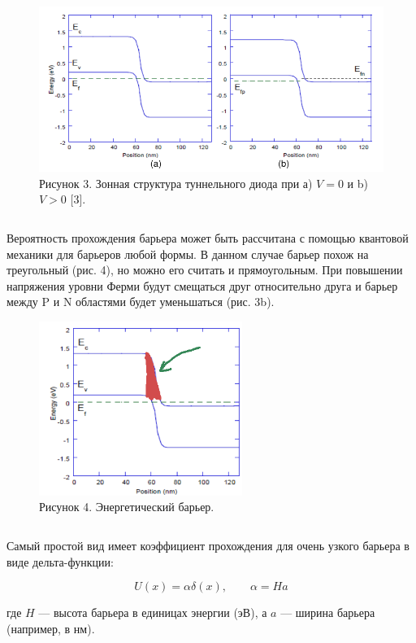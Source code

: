 \documentclass[
]{article}
\begin{document}
\begin{figure}
\centering
\includegraphics[width=5.20833in,height=\textheight]{images/diode-scheme-2.png}
\caption{Рисунок 3. Зонная структура туннельного диода при а) \(V=0\) и
b) \(V>0\) {[}3{]}.}
\end{figure}

\[ \]

Вероятность прохождения барьера может быть рассчитана с помощью
квантовой механики для барьеров любой формы. В данном случае барьер
похож на треугольный (рис. 4), но можно его считать и прямоугольным. При
повышении напряжения уровни Ферми будут смещаться друг относительно
друга и барьер между P и N областями будет уменьшаться (рис. 3b).

\begin{figure}
\centering
\includegraphics[width=2.60417in,height=\textheight]{images/diode-scheme-3.png}
\caption{Рисунок 4. Энергетический барьер.}
\end{figure}

\[ \]

Самый простой вид имеет коэффициент прохождения для очень узкого барьера
в виде дельта-функции:

\[U(x)=\alpha \delta(x),\qquad \alpha = Ha \tag{2}\]

где \(H\) --- высота барьера в единицах энергии (эВ), а \(a\) --- ширина
барьера (например, в нм).
\end{document}
